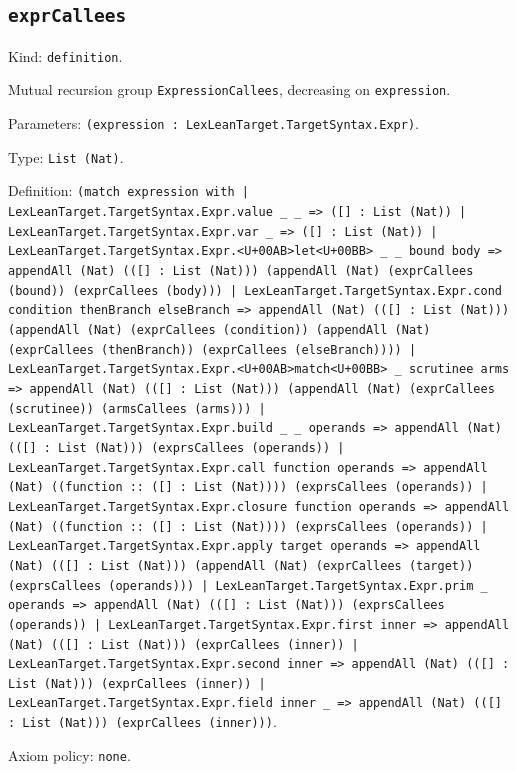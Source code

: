 \documentclass[11pt]{article}
\begin{document}
\subsection*{\texttt{exprCallees}}
\noindent Kind: \texttt{definition}.\par
\noindent Mutual recursion group \texttt{ExpressionCallees}, decreasing on \texttt{expression}.\par
\noindent Parameters: \texttt{(expression : LexLeanTarget.TargetSyntax.Expr)}.\par
\noindent Type: \texttt{List (Nat)}.\par
\noindent Definition: \texttt{(match expression with | LexLeanTarget.TargetSyntax.Expr.value \_ \_ => ([] : List (Nat)) | LexLeanTarget.TargetSyntax.Expr.var \_ => ([] : List (Nat)) | LexLeanTarget.TargetSyntax.Expr.<U+00AB>let<U+00BB> \_ \_ bound body => appendAll (Nat) (([] : List (Nat))) (appendAll (Nat) (exprCallees (bound)) (exprCallees (body))) | LexLeanTarget.TargetSyntax.Expr.cond condition thenBranch elseBranch => appendAll (Nat) (([] : List (Nat))) (appendAll (Nat) (exprCallees (condition)) (appendAll (Nat) (exprCallees (thenBranch)) (exprCallees (elseBranch)))) | LexLeanTarget.TargetSyntax.Expr.<U+00AB>match<U+00BB> \_ scrutinee arms => appendAll (Nat) (([] : List (Nat))) (appendAll (Nat) (exprCallees (scrutinee)) (armsCallees (arms))) | LexLeanTarget.TargetSyntax.Expr.build \_ \_ operands => appendAll (Nat) (([] : List (Nat))) (exprsCallees (operands)) | LexLeanTarget.TargetSyntax.Expr.call function operands => appendAll (Nat) ((function :: ([] : List (Nat)))) (exprsCallees (operands)) | LexLeanTarget.TargetSyntax.Expr.closure function operands => appendAll (Nat) ((function :: ([] : List (Nat)))) (exprsCallees (operands)) | LexLeanTarget.TargetSyntax.Expr.apply target operands => appendAll (Nat) (([] : List (Nat))) (appendAll (Nat) (exprCallees (target)) (exprsCallees (operands))) | LexLeanTarget.TargetSyntax.Expr.prim \_ operands => appendAll (Nat) (([] : List (Nat))) (exprsCallees (operands)) | LexLeanTarget.TargetSyntax.Expr.first inner => appendAll (Nat) (([] : List (Nat))) (exprCallees (inner)) | LexLeanTarget.TargetSyntax.Expr.second inner => appendAll (Nat) (([] : List (Nat))) (exprCallees (inner)) | LexLeanTarget.TargetSyntax.Expr.field inner \_ => appendAll (Nat) (([] : List (Nat))) (exprCallees (inner)))}.\par
\noindent Axiom policy: \texttt{none}.\par
\end{document}
